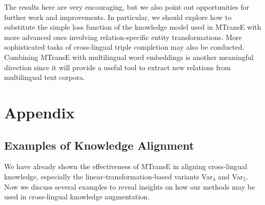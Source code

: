 \documentclass{article}
\begin{document}
The results here are very encouraging, but we also point out opportunities for further work and improvements. In particular, we
should explore how to substitute the simple loss function of the knowledge model used in MTransE with more advanced ones involving relation-specific entity transformations.
More sophisticated tasks of cross-lingual triple completion may also be conducted.
Combining MTransE with multilingual word embeddings \cite{xing2015normalized}
is another meaningful direction since it will provide a useful tool to extract new relations from multilingual text corpora.



\begingroup

\endgroup
\clearpage



\newpage
\section{Appendix}
\subsection{Examples of Knowledge Alignment}		

We have already shown the effectiveness of MTransE in aligning cross-lingual knowledge, 		
especially the linear-transformation-based variants Var$_4$ and Var$_5$.
Now we discuss several examples to reveal insights on how our methods may be used in cross-lingual knowledge augmentation.		\par
\end{document}

